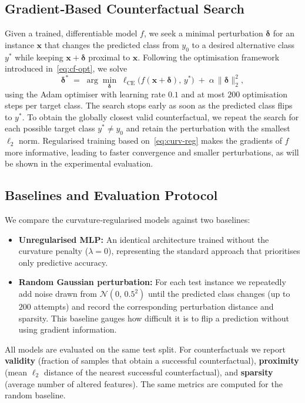 \documentclass[11pt,a4paper]{article}
\begin{document}
\subsection{Gradient‑Based Counterfactual Search}
Given a trained, differentiable model \(f\), we seek a minimal perturbation \(\boldsymbol{\delta}\) for an instance \(\mathbf{x}\) that changes the predicted class from \(y_0\) to a desired alternative class \(y^*\) while keeping \(\mathbf{x}+\boldsymbol{\delta}\) proximal to \(\mathbf{x}\). Following the optimisation framework introduced in~\eqref{eq:cf-opt}, we solve
\begin{equation}
\boldsymbol{\delta}^* \;=\; \arg\min_{\boldsymbol{\delta}}\;
   \ell_{\mathrm{CE}}\bigl(f(\mathbf{x}+\boldsymbol{\delta}),\,y^*\bigr)
   \;+\; \alpha\,\|\boldsymbol{\delta}\|_2^2,
\end{equation}
using the Adam optimiser with learning rate \(0.1\) and at most \(200\) optimisation steps per target class. The search stops early as soon as the predicted class flips to \(y^*\). To obtain the globally closest valid counterfactual, we repeat the search for each possible target class \(y^*\neq y_0\) and retain the perturbation with the smallest \(\ell_2\) norm. Regularised training based on~\eqref{eq:curv-reg} makes the gradients of \(f\) more informative, leading to faster convergence and smaller perturbations, as will be shown in the experimental evaluation.

\subsection{Baselines and Evaluation Protocol}
We compare the curvature‑regularised models against two baselines:
\begin{itemize}
  \item \textbf{Unregularised MLP:} An identical architecture trained without the curvature penalty (\(\lambda=0\)), representing the standard approach that prioritises only predictive accuracy.
  \item \textbf{Random Gaussian perturbation:} For each test instance we repeatedly add noise drawn from \(\mathcal{N}(0,\,0.5^2)\) until the predicted class changes (up to \(200\) attempts) and record the corresponding perturbation distance and sparsity. This baseline gauges how difficult it is to flip a prediction without using gradient information.
\end{itemize}
All models are evaluated on the same test split. For counterfactuals we report \textbf{validity} (fraction of samples that obtain a successful counterfactual), \textbf{proximity} (mean \(\ell_2\) distance of the nearest successful counterfactual), and \textbf{sparsity} (average number of altered features). The same metrics are computed for the random baseline.
\end{document}
